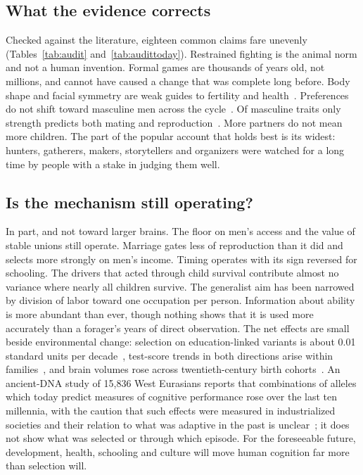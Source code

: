 \subsection{What the evidence corrects}

Checked against the literature, eighteen common claims fare unevenly (Tables~\ref{tab:audit} and~\ref{tab:audittoday}). Restrained
fighting is the animal norm and not a human invention. Formal games are thousands of years old, not millions, and cannot
have caused a change that was complete long before. Body shape and facial symmetry are weak guides to fertility and
health~\cite{lidborg2025,pound2014}. Preferences do not shift toward masculine men across the cycle~\cite{wood2014,jones2018}. Of
masculine traits only strength predicts both mating and reproduction~\cite{lidborg2022}. More partners do not mean more
children. The part of the popular account that holds best is its widest: hunters, gatherers, makers, storytellers and
organizers were watched for a long time by people with a stake in judging them well.

\subsection{Is the mechanism still operating?}

In part, and not toward larger brains. The floor on men's access and the value of stable unions still operate. Marriage
gates less of reproduction than it did and selects more strongly on men's income. Timing operates with its sign reversed
for schooling. The drivers that acted through child survival contribute almost no variance where nearly all children
survive. The generalist aim has been narrowed by division of labor toward one occupation per person. Information about
ability is more abundant than ever, though nothing shows that it is used more accurately than a forager's years of direct
observation. The net effects are small beside environmental change: selection on education-linked variants is about 0.01
standard units per decade~\cite{kong2017}, test-score trends in both directions arise within
families~\cite{bratsberg2018}, and brain volumes rose across twentieth-century birth cohorts~\cite{decarli2024}. An
ancient-DNA study of 15,836 West Eurasians reports that combinations of alleles which today predict measures of cognitive
performance rose over the last ten millennia, with the caution that such effects were measured in industrialized societies
and their relation to what was adaptive in the past is unclear~\cite{akbari2026}; it does not show what was selected or
through which episode. For the foreseeable future, development, health, schooling and culture will move human cognition
far more than selection will.

